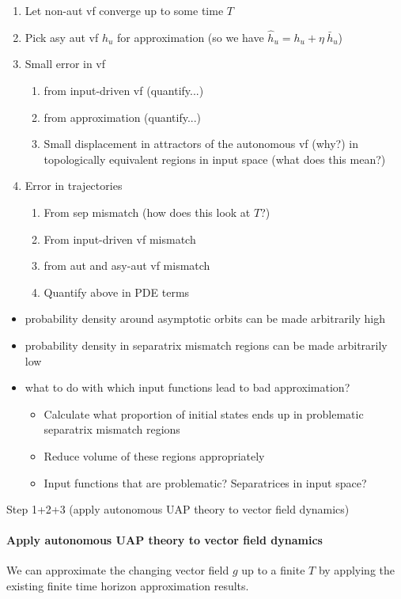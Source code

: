 \documentclass{article}
\theoremstyle{definition} \newtheorem{definition}{Definition}
\theoremstyle{remark} \newtheorem{remark}{Remark}
\newcounter{ct}
\begin{document}
\begin{enumerate}
\item Let non-aut vf converge up to some time $T$
\item Pick asy aut vf $h_u$ for approximation (so we have $\hat h_u = h_u + \eta\ \bar h_u$)
\item Small error in vf
\begin{enumerate}
\item from input-driven vf (quantify...)
\item from approximation (quantify...)
\item Small displacement in attractors of the autonomous vf (why?) in topologically equivalent regions in input space (what does this mean?)
\end{enumerate}
\item Error in trajectories
\begin{enumerate}
\item From sep mismatch (how does this look at $T$?)
\item From input-driven vf mismatch
\item from aut and asy-aut vf mismatch
\item Quantify above in PDE terms
\end{enumerate}
\end{enumerate}

\begin{itemize}
\item probability density around asymptotic orbits can be made arbitrarily high
\item probability density in separatrix mismatch regions can be made arbitrarily low
\item what to do with which input functions lead to bad approximation?
\begin{itemize}
\item Calculate what proportion of initial states ends up in problematic separatrix mismatch regions
\item Reduce volume of these regions appropriately
\item Input functions that are problematic? Separatrices in input space?
\end{itemize}
\end{itemize}

Step 1+2+3 (apply autonomous UAP theory to vector field dynamics)
\paragraph{Apply autonomous UAP theory to vector field dynamics} %
We can approximate the changing vector field $g$ up to a finite $T$ by applying the existing finite time horizon approximation results.
\end{document}
